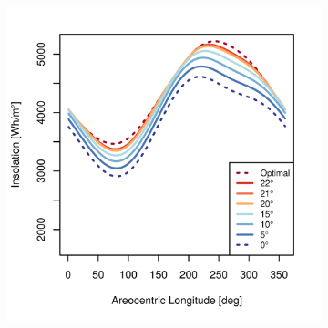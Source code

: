 \begin{figure}[h]
\vspace{-2ex}
\centering
    \setlength{\subfigureWidth}{0.50\textwidth}
    \setlength{\graphicsHeight}{60mm}
    \hypersetup{hidelinks=true}%
    \begin{subfigure}[t]{\subfigureWidth}
        \centering
            \includegraphics[height=\graphicsHeight]{sections/mission-sites/plots/iani-chaos-solar-insolations-for-different-beta-inclinations.png}
            \label{fig:plot:sub:solar-insolations-for-different-beta-iani-chaos}
    \end{subfigure}\hfill
    \begin{subfigure}[t]{\subfigureWidth}
        \centering

\end{subfigure}
\end{figure}
